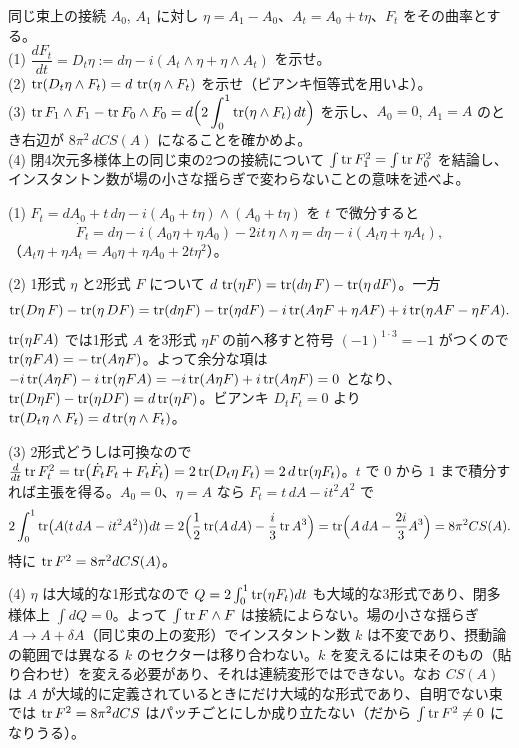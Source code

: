 \begin{problem}[難易度 B]\label{ch08-prob-transg}
同じ束上の接続 $A_0$, $A_1$ に対し $\eta=A_1-A_0$、$A_t=A_0+t\eta$、$F_t$ をその曲率とする。\\
(1) $\dfrac{dF_t}{dt}=D_t\eta:=d\eta-i(A_t\wedge\eta+\eta\wedge A_t)$ を示せ。\\
(2) $\tr(D_t\eta\wedge F_t)=d\,\tr(\eta\wedge F_t)$ を示せ（ビアンキ恒等式を用いよ）。\\
(3) $\tr F_1\wedge F_1-\tr F_0\wedge F_0=d\Bigl(2\displaystyle\int_0^1\tr(\eta\wedge F_t)\,dt\Bigr)$ を示し、$A_0=0$, $A_1=A$ のとき右辺が $8\pi^2\,dCS(A)$ になることを確かめよ。\\
(4) 閉4次元多様体上の同じ束の2つの接続について $\int\tr F_1^2=\int\tr F_0^2$ を結論し、インスタントン数が場の小さな揺らぎで変わらないことの意味を述べよ。
\end{problem}

\begin{solution}
(1) $F_t=dA_0+t\,d\eta-i(A_0+t\eta)\wedge(A_0+t\eta)$ を $t$ で微分すると
\[
\dot F_t=d\eta-i(A_0\eta+\eta A_0)-2it\,\eta\wedge\eta=d\eta-i(A_t\eta+\eta A_t),
\]
（$A_t\eta+\eta A_t=A_0\eta+\eta A_0+2t\eta^2$）。

(2) 1形式 $\eta$ と2形式 $F$ について $d\,\tr(\eta F)=\tr(d\eta\,F)-\tr(\eta\,dF)$。一方
\[
\tr(D\eta\,F)-\tr(\eta\,DF)=\tr(d\eta F)-\tr(\eta dF)-i\tr(A\eta F+\eta AF)+i\tr(\eta AF-\eta FA).
\]
$\tr(\eta FA)$ では1形式 $A$ を3形式 $\eta F$ の前へ移すと符号 $(-1)^{1\cdot3}=-1$ がつくので $\tr(\eta FA)=-\tr(A\eta F)$。よって余分な項は $-i\tr(A\eta F)-i\tr(\eta FA)=-i\tr(A\eta F)+i\tr(A\eta F)=0$ となり、$\tr(D\eta F)-\tr(\eta DF)=d\tr(\eta F)$。ビアンキ $D_tF_t=0$ より $\tr(D_t\eta\wedge F_t)=d\tr(\eta\wedge F_t)$。

(3) 2形式どうしは可換なので $\frac{d}{dt}\tr F_t^2=\tr(\dot F_tF_t+F_t\dot F_t)=2\tr(D_t\eta\,F_t)=2\,d\tr(\eta F_t)$。$t$ で $0$ から $1$ まで積分すれば主張を得る。$A_0=0$、$\eta=A$ なら $F_t=t\,dA-it^2A^2$ で
\[
2\int_0^1\tr\bigl(A(t\,dA-it^2A^2)\bigr)dt=2\Bigl(\frac12\tr(A\,dA)-\frac i3\tr A^3\Bigr)=\tr\Bigl(A\,dA-\frac{2i}{3}A^3\Bigr)=8\pi^2CS(A).
\]
特に $\tr F^2=8\pi^2dCS(A)$。

(4) $\eta$ は大域的な1形式なので $Q=2\int_0^1\tr(\eta F_t)dt$ も大域的な3形式であり、閉多様体上 $\int dQ=0$。よって $\int\tr F\wedge F$ は接続によらない。場の小さな揺らぎ $A\to A+\delta A$（同じ束の上の変形）でインスタントン数 $k$ は不変であり、摂動論の範囲では異なる $k$ のセクターは移り合わない。$k$ を変えるには束そのもの（貼り合わせ）を変える必要があり、それは連続変形ではできない。なお $CS(A)$ は $A$ が大域的に定義されているときにだけ大域的な形式であり、自明でない束では $\tr F^2=8\pi^2dCS$ はパッチごとにしか成り立たない（だから $\int\tr F^2\ne0$ になりうる）。
\end{solution}

